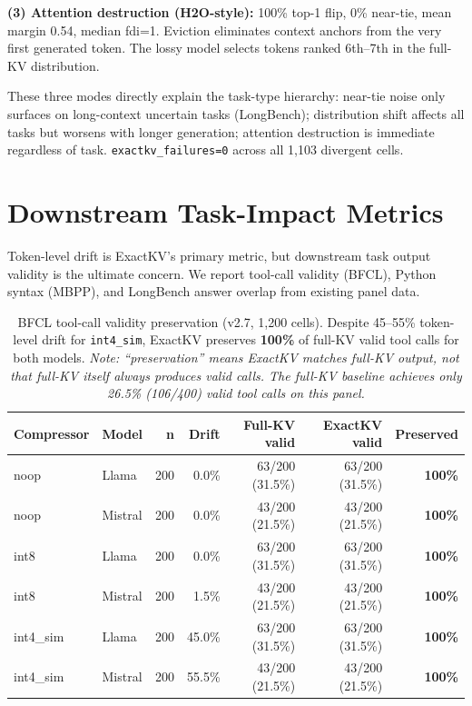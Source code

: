\documentclass[11pt]{article}
\begin{document}
\textbf{(3) Attention destruction (H2O-style):} 100\% top-1 flip, 0\% near-tie, mean margin
0.54, median fdi=1. Eviction eliminates context anchors from the very first generated
token. The lossy model selects tokens ranked 6th--7th in the full-KV distribution.

These three modes directly explain the task-type hierarchy: near-tie noise only surfaces
on long-context uncertain tasks (LongBench); distribution shift affects all tasks but
worsens with longer generation; attention destruction is immediate regardless of task.
\texttt{exactkv\_failures=0} across all 1,103 divergent cells.

\section{Downstream Task-Impact Metrics}
\label{sec:downstream}

Token-level drift is ExactKV's primary metric, but downstream task output validity is
the ultimate concern. We report tool-call validity (BFCL), Python syntax (MBPP), and
LongBench answer overlap from existing panel data.

\begin{table}[htbp]
\centering\small\setlength\tabcolsep{5pt}
\renewcommand{\arraystretch}{1.05}
\begin{tabular}{llrrrrr}
\toprule
\textbf{Compressor} & \textbf{Model} & \textbf{n} & \textbf{Drift} & \textbf{Full-KV valid} & \textbf{ExactKV valid} & \textbf{Preserved} \\
\midrule
noop      & Llama   & 200 &  0.0\% & 63/200 (31.5\%) & 63/200 (31.5\%) & \textbf{100\%} \\
noop      & Mistral & 200 &  0.0\% & 43/200 (21.5\%) & 43/200 (21.5\%) & \textbf{100\%} \\
int8      & Llama   & 200 &  0.0\% & 63/200 (31.5\%) & 63/200 (31.5\%) & \textbf{100\%} \\
int8      & Mistral & 200 &  1.5\% & 43/200 (21.5\%) & 43/200 (21.5\%) & \textbf{100\%} \\
int4\_sim & Llama   & 200 & 45.0\% & 63/200 (31.5\%) & 63/200 (31.5\%) & \textbf{100\%} \\
int4\_sim & Mistral & 200 & 55.5\% & 43/200 (21.5\%) & 43/200 (21.5\%) & \textbf{100\%} \\
\bottomrule
\end{tabular}
\caption{BFCL tool-call validity preservation (v2.7, 1,200 cells). Despite 45--55\%
token-level drift for \texttt{int4\_sim}, ExactKV preserves \textbf{100\%} of full-KV
valid tool calls for both models. \emph{Note: ``preservation'' means ExactKV matches
full-KV output, not that full-KV itself always produces valid calls. The full-KV
baseline achieves only 26.5\% (106/400) valid tool calls on this panel.}}
\label{tab:downstream-validity}
\end{table}
\end{document}
